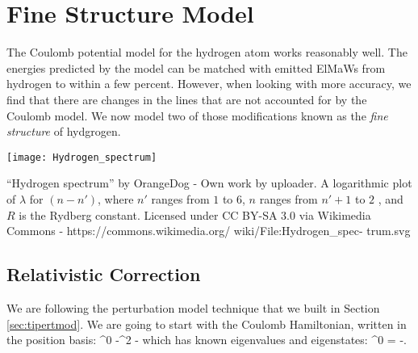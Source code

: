 \chapter{Fine Structure Model}

The Coulomb potential model for the hydrogen atom works reasonably well. The energies predicted by the model can be matched with emitted ElMaWs from hydrogen to within a few percent. However, when looking with more accuracy, we find that there are changes in the lines that are not accounted for by the Coulomb model. We now model two of those modifications known as the {\em fine structure} of hydgrogen.
\begin{marginfigure}
\texttt{[image: Hydrogen\_spectrum]}
\caption{``Hydrogen spectrum'' by OrangeDog - Own work by uploader. A logarithmic plot of $\lambda$ for $(n-n')$, where $n'$ ranges from $1$ to $6$, $n$ ranges from $n' + 1$ to $2$ , and $R$ is the Rydberg constant. Licensed under CC BY-SA 3.0 via Wikimedia Commons - https://commons.wikimedia.org/ wiki/File:Hydrogen\_spec- trum.svg}
\end{marginfigure}

\section{Relativistic Correction}
We are following the perturbation model technique that we built in Section \ref{sec:tipertmod}. We are going to start with the Coulomb Hamiltonian, written in the position basis:
\beq
{}^0 \rightarrow -\nabla^2 - 
\eeq
which has known eigenvalues and eigenstates:
\beq
{}^0 = -.
\eeq

